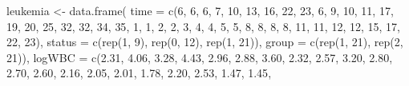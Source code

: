 \documentclass[
]{article}
\newenvironment{Shaded}{\begin{snugshade}}{\end{snugshade}}
\newcommand{\AttributeTok}[1]{\textcolor[rgb]{0.40,0.45,0.13}{#1}}
\newcommand{\DecValTok}[1]{\textcolor[rgb]{0.68,0.00,0.00}{#1}}
\newcommand{\FloatTok}[1]{\textcolor[rgb]{0.68,0.00,0.00}{#1}}
\newcommand{\FunctionTok}[1]{\textcolor[rgb]{0.28,0.35,0.67}{#1}}
\newcommand{\NormalTok}[1]{\textcolor[rgb]{0.00,0.23,0.31}{#1}}
\newcommand{\OtherTok}[1]{\textcolor[rgb]{0.00,0.23,0.31}{#1}}
\begin{document}
\begin{Shaded}
\begin{Highlighting}[]
\NormalTok{leukemia }\OtherTok{\textless{}{-}} \FunctionTok{data.frame}\NormalTok{(}
  \AttributeTok{time =} \FunctionTok{c}\NormalTok{(}\DecValTok{6}\NormalTok{, }\DecValTok{6}\NormalTok{, }\DecValTok{6}\NormalTok{, }\DecValTok{7}\NormalTok{, }\DecValTok{10}\NormalTok{, }\DecValTok{13}\NormalTok{, }\DecValTok{16}\NormalTok{, }\DecValTok{22}\NormalTok{, }\DecValTok{23}\NormalTok{, }\DecValTok{6}\NormalTok{, }\DecValTok{9}\NormalTok{, }\DecValTok{10}\NormalTok{, }\DecValTok{11}\NormalTok{, }\DecValTok{17}\NormalTok{, }\DecValTok{19}\NormalTok{, }\DecValTok{20}\NormalTok{, }\DecValTok{25}\NormalTok{, }\DecValTok{32}\NormalTok{, }\DecValTok{32}\NormalTok{, }\DecValTok{34}\NormalTok{, }\DecValTok{35}\NormalTok{,}
           \DecValTok{1}\NormalTok{, }\DecValTok{1}\NormalTok{, }\DecValTok{2}\NormalTok{, }\DecValTok{2}\NormalTok{, }\DecValTok{3}\NormalTok{, }\DecValTok{4}\NormalTok{, }\DecValTok{4}\NormalTok{, }\DecValTok{5}\NormalTok{, }\DecValTok{5}\NormalTok{, }\DecValTok{8}\NormalTok{, }\DecValTok{8}\NormalTok{, }\DecValTok{8}\NormalTok{, }\DecValTok{8}\NormalTok{, }\DecValTok{11}\NormalTok{, }\DecValTok{11}\NormalTok{, }\DecValTok{12}\NormalTok{, }\DecValTok{12}\NormalTok{, }\DecValTok{15}\NormalTok{, }\DecValTok{17}\NormalTok{, }\DecValTok{22}\NormalTok{, }\DecValTok{23}\NormalTok{),}
  \AttributeTok{status =} \FunctionTok{c}\NormalTok{(}\FunctionTok{rep}\NormalTok{(}\DecValTok{1}\NormalTok{, }\DecValTok{9}\NormalTok{), }\FunctionTok{rep}\NormalTok{(}\DecValTok{0}\NormalTok{, }\DecValTok{12}\NormalTok{), }\FunctionTok{rep}\NormalTok{(}\DecValTok{1}\NormalTok{, }\DecValTok{21}\NormalTok{)),}
  \AttributeTok{group =} \FunctionTok{c}\NormalTok{(}\FunctionTok{rep}\NormalTok{(}\DecValTok{1}\NormalTok{, }\DecValTok{21}\NormalTok{), }\FunctionTok{rep}\NormalTok{(}\DecValTok{2}\NormalTok{, }\DecValTok{21}\NormalTok{)),}
  \AttributeTok{logWBC =} \FunctionTok{c}\NormalTok{(}\FloatTok{2.31}\NormalTok{, }\FloatTok{4.06}\NormalTok{, }\FloatTok{3.28}\NormalTok{, }\FloatTok{4.43}\NormalTok{, }\FloatTok{2.96}\NormalTok{, }\FloatTok{2.88}\NormalTok{, }\FloatTok{3.60}\NormalTok{, }\FloatTok{2.32}\NormalTok{, }\FloatTok{2.57}\NormalTok{, }
             \FloatTok{3.20}\NormalTok{, }\FloatTok{2.80}\NormalTok{, }\FloatTok{2.70}\NormalTok{, }\FloatTok{2.60}\NormalTok{, }\FloatTok{2.16}\NormalTok{, }\FloatTok{2.05}\NormalTok{, }\FloatTok{2.01}\NormalTok{, }\FloatTok{1.78}\NormalTok{, }\FloatTok{2.20}\NormalTok{, }\FloatTok{2.53}\NormalTok{, }\FloatTok{1.47}\NormalTok{, }\FloatTok{1.45}\NormalTok{,}

\end{Highlighting}
\end{Shaded}
\end{document}
